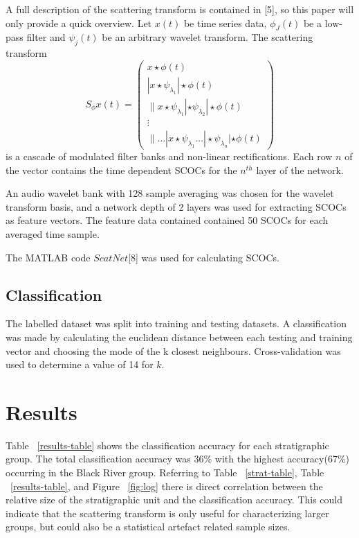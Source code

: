 \documentclass{article} %
\begin{document}
A full description of the scattering transform is contained in [5],
so this paper will only provide a quick overview. Let $x(t)$ be time series
data, $\phi_{J}(t)$ be a low-pass filter and $\psi_{j}(t)$ be an
arbitrary wavelet transform. The scattering transform
\begin{equation}
S_{\phi}x(t) =
\begin{pmatrix}
x \star \phi(t)\\
|x \star \psi_{\lambda_1}|\star \phi(t) \\
\|x \star \psi_{\lambda_1}| \star \psi_{\lambda_2}| \star \phi(t) \\
\vdots \\
\| \hdots |x \star \psi_{\lambda_1} \hdots | \star \psi_{\lambda_n}| \star \phi(t)
\end{pmatrix}
\end{equation}
is a cascade of modulated filter banks and non-linear
rectifications. Each row $n$ of the vector contains the time dependent
SCOCs for the $n^{th}$ layer of the network. 

An audio wavelet bank with 128 sample averaging was chosen for
the wavelet transform basis, and a network depth of 2 layers was used
for extracting SCOCs as feature vectors. The feature data contained
contained 50 SCOCs for each averaged time sample.

The MATLAB code $ScatNet$[8] was used for
calculating SCOCs.

\subsection{Classification}
The labelled dataset was split into training and testing datasets. A
classification was made by calculating the euclidean distance between
each testing and training vector and choosing the mode of the k
closest neighbours. Cross-validation was used to determine a
value of 14 for $k$.

\section{Results}
Table ~\ref{results-table} shows the classification accuracy for each
stratigraphic group. The total classification accuracy was 36\% with
the highest accuracy(67\%) occurring in the Black River
group. Referring to Table ~\ref{strat-table}, Table ~\ref{results-table}, and Figure
~\ref{fig:log} there is direct correlation between the relative size
of the stratigraphic unit and the classification accuracy. This could
indicate that the scattering transform is only useful for characterizing
larger groups, but could also be a statistical artefact related sample
sizes. 
\end{document}
